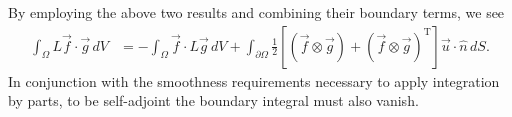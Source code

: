 \documentclass[letterpaper,reqno,11pt]{amsart}
\begin{document}
By employing the above two results and combining their boundary terms, we see
\begin{align}
  \int_{\Omega} L\vec{f}\cdot\vec{g}\,d\!V
  &=
  - \int_{\Omega} \vec{f}\cdot{}L\vec{g} \,d\!V
  + \int_{\partial\Omega} \frac{1}{2}\left[
        \left(\vec{f}\otimes\vec{g}\right)
      + \left(\vec{f}\otimes\vec{g}\right)^{\mathrm{T}} %
    \right] \vec{u}\cdot\hat{n} \,d\!S
  .
\end{align}
In conjunction with the smoothness requirements necessary to apply integration by parts,
to be self-adjoint the boundary integral must also vanish.
\end{document}
